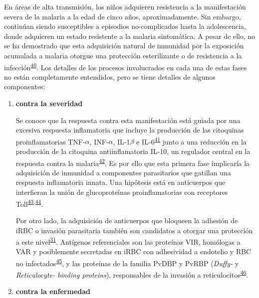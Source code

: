\documentclass[]{article}
\begin{document}
\begin{enumerate}
\begin{enumerate}
    En áreas de alta transmisión, los niños adquieren resistencia a la
    manifestación severa de la malaria a la edad de cinco años,
    aproximadamente. Sin embargo, continúan siendo susceptibles a
    episodios no-complicados hasta la adolescencia, donde adquieren un
    estado resistente a la malaria sintomática. A pesar de ello, no se
    ha demostrado que esta adquisición natural de inmunidad por la
    exposición acumulada a malaria otorgue una protección esterilizante
    o de resistencia a la
    infección\textsuperscript{\protect\hyperlink{ref-crompton2014rev}{40}}.
    Los detalles de los procesos involucrados en cada una de estas fases
    no están completamente entendidos, pero se tiene detalles de algunos
    componentes:

    \begin{enumerate}
    \def\labelenumiii{\arabic{enumiii}.}
    \item
      \textbf{contra la severidad}

      Se conoce que la respuesta contra esta manifestación está guiada
      por una excesiva respuesta inflamatoria que incluye la producción
      de las citoquinas proinflamatorias TNF-\(\alpha\), INF-\(\alpha\),
      IL-1\(\beta\) e
      IL-6\textsuperscript{\protect\hyperlink{ref-baird2013}{41}} junto
      a una reducción en la producción de la citoquina antiinflamatoria
      IL-10, un regulador central en la respuesta contra la
      malaria\textsuperscript{\protect\hyperlink{ref-jagannathan2014}{42}}.
      Es por ello que esta primera fase implicaría la adquisición de
      inmunidad a componentes parasitarios que gatillan una respuesta
      inflamatoria innata. Una hipótesis está en anticuerpos que
      interfieran la unión de glucoproteínas proinflamatorias con
      receptores
      Toll\textsuperscript{\protect\hyperlink{ref-schofield2006toll}{43},\protect\hyperlink{ref-coban2005toll}{44}}.

      Por otro lado, la adquisición de anticuerpos que bloqueen la
      adhesión de iRBC o invasión parasitaria también son candidatos a
      otorgar una protección a este
      nivel\textsuperscript{\protect\hyperlink{ref-wassmer2015}{31}}.
      Antígenos referenciales son las proteínas VIR, homólogas a VAR y
      posiblemente secretadas en iRBC con adhesividad a endotelio y RBC
      no
      infectados\textsuperscript{\protect\hyperlink{ref-portillo2001vir}{45}},
      y las proteínas de la familia PvDBP y PvRBP (\emph{Duffy-} y
      \emph{Reticulocyte- binding proteins}), responsables de la
      invasión a
      reticulocitos\textsuperscript{\protect\hyperlink{ref-galinski1992rbp}{46}}.
      \newpage
    \item
      \textbf{contra la enfermedad}


\end{enumerate}
\end{enumerate}
\end{enumerate}
\end{document}
